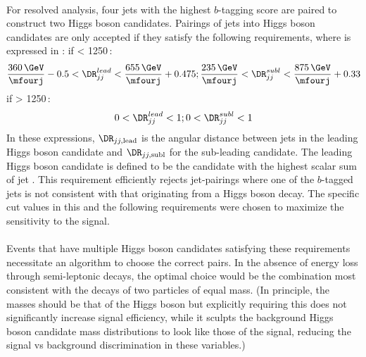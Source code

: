 \paragraph{}
For resolved analysis, four jets with the highest $b$-tagging score are paired to construct two Higgs boson candidates. Pairings of jets into Higgs boson candidates are only accepted if they satisfy the following requirements, where \mfourj is expressed in \GeV:
if \mfourj  < 1250\,\GeV:
\begin{equation}
\frac{360\,\GeV}{\mfourj} - 0.5 < \DR_{jj}^{lead} < \frac{655\,\GeV}{\mfourj} + 0.475;
\frac{235\,\GeV}{\mfourj} < \DR_{jj}^{subl}  < \frac{875\,\GeV}{\mfourj} + 0.33
\end{equation}
if \mfourj  > 1250\,\GeV:
\begin{equation}
0< \DR_{jj}^{lead} < 1; 0 < \DR_{jj}^{subl} < 1
\end{equation}
In these expressions, $\DR_{jj, \mathrm{lead}}$ is the angular distance between jets in the leading Higgs boson candidate and $\DR_{jj, \mathrm{subl}}$ for the sub-leading candidate. The leading Higgs boson candidate is defined to be the candidate with the highest scalar sum of jet \pt. This requirement efficiently rejects jet-pairings where one of the $b$-tagged jets is not consistent with that originating from a Higgs boson decay. The specific cut values in this and the following requirements were chosen to maximize the sensitivity to the signal.

\paragraph{}
Events that have multiple Higgs boson candidates satisfying these requirements %
necessitate an algorithm to choose the correct pairs. In the absence of energy loss through semi-leptonic decays, the optimal choice would be the combination most consistent with the decays of two particles of equal mass. (In principle, the masses should be that of the Higgs boson but explicitly requiring this does not significantly increase signal efficiency, while it sculpts the background Higgs boson candidate mass distributions to look like those of the signal, reducing the signal vs background discrimination in these variables.)

